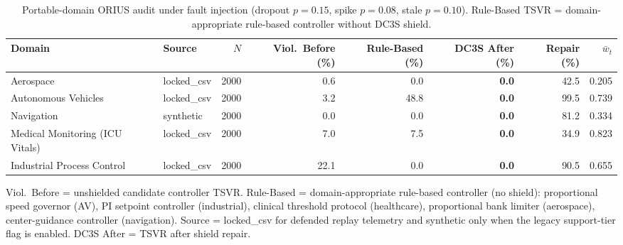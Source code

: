 \begin{table}[htbp]
\centering
\caption{Portable-domain ORIUS audit under fault injection (dropout $p{=}0.15$, spike $p{=}0.08$, stale $p{=}0.10$). Rule-Based TSVR = domain-appropriate rule-based controller without DC3S shield.}
\label{tab:all_domain_comparison}
\begin{tabular}{llrrrrrr}
\toprule
Domain & Source & $N$ & Viol.\ Before (\%) & Rule-Based (\%) & DC3S After (\%) & Repair (\%) & $\bar{w}_t$ \\
\midrule
Aerospace & locked\_csv & 2000 & 0.6 & 0.0 & \textbf{0.0} & 42.5 & 0.205 \\
Autonomous Vehicles & locked\_csv & 2000 & 3.2 & 48.8 & \textbf{0.0} & 99.5 & 0.739 \\
Navigation & synthetic & 2000 & 0.0 & 0.0 & \textbf{0.0} & 81.2 & 0.334 \\
Medical Monitoring (ICU Vitals) & locked\_csv & 2000 & 7.0 & 7.5 & \textbf{0.0} & 34.9 & 0.823 \\
Industrial Process Control & locked\_csv & 2000 & 22.1 & 0.0 & \textbf{0.0} & 90.5 & 0.655 \\
\bottomrule
\end{tabular}
\smallskip
\begin{minipage}{\linewidth}\footnotesize
Viol.\ Before = unshielded candidate controller TSVR. Rule-Based = domain-appropriate rule-based controller (no shield): proportional speed governor (AV), PI setpoint controller (industrial), clinical threshold protocol (healthcare), proportional bank limiter (aerospace), center-guidance controller (navigation). Source = locked\_csv for defended replay telemetry and synthetic only when the legacy support-tier flag is enabled. DC3S After = TSVR after shield repair.
\end{minipage}
\end{table}